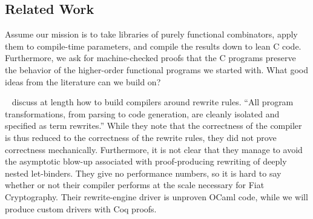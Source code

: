 \documentclass[a4paper,USenglish,cleveref,autoref,thm-restate]{lipics-v2021}
\newcommand{\citet}[1]{\usebibentry{#1}{citet}~\cite{#1}}
\begin{document}

\subsection{Related Work}\label{sec:related-one}

Assume our mission is to take libraries of purely functional combinators, apply them to compile-time parameters, and compile the results down to lean C code.
Furthermore, we ask for machine-checked proofs that the C programs preserve the behavior of the higher-order functional programs we started with.
What good ideas from the literature can we build on?

\citet{Hickey2006} discuss at length how to build compilers around rewrite rules.
``All program transformations, from parsing to code generation, are cleanly isolated and specified as term rewrites.''
While they note that the correctness of the compiler is thus reduced to the correctness of the rewrite rules, they did not prove correctness mechanically.
Furthermore, it is not clear that they manage to avoid the asymptotic blow-up associated with proof-producing rewriting of deeply nested let-binders.
They give no performance numbers, so it is hard to say whether or not their compiler performs at the scale necessary for Fiat Cryptography.
Their rewrite-engine driver is unproven OCaml code, while we will produce custom drivers with Coq proofs.
\end{document}
